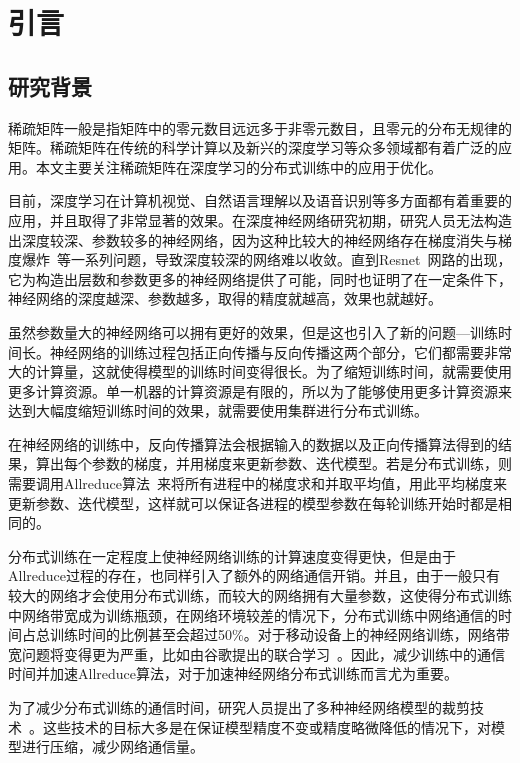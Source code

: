 \chapter{引言}
\label{chap1}

\section{研究背景}
稀疏矩阵一般是指矩阵中的零元数目远远多于非零元数目，且零元的分布无规律的矩阵。稀疏矩阵在传统的科学计算以及新兴的深度学习等众多领域都有着广泛的应用。本文主要关注稀疏矩阵在深度学习的分布式训练中的应用于优化。

目前，深度学习在计算机视觉、自然语言理解以及语音识别等多方面都有着重要的应用，并且取得了非常显著的效果。在深度神经网络研究初期，研究人员无法构造出深度较深、参数较多的神经网络，因为这种比较大的神经网络存在梯度消失与梯度爆炸~\cite{bengio1994learning, glorot2010understanding}等一系列问题，导致深度较深的网络难以收敛。直到Resnet~\cite{he2016deep}网路的出现，它为构造出层数和参数更多的神经网络提供了可能，同时也证明了在一定条件下，神经网络的深度越深、参数越多，取得的精度就越高，效果也就越好。

虽然参数量大的神经网络可以拥有更好的效果，但是这也引入了新的问题---训练时间长。神经网络的训练过程包括正向传播与反向传播这两个部分，它们都需要非常大的计算量，这就使得模型的训练时间变得很长。为了缩短训练时间，就需要使用更多计算资源。单一机器的计算资源是有限的，所以为了能够使用更多计算资源来达到大幅度缩短训练时间的效果，就需要使用集群进行分布式训练。

在神经网络的训练中，反向传播算法会根据输入的数据以及正向传播算法得到的结果，算出每个参数的梯度，并用梯度来更新参数、迭代模型。若是分布式训练，则需要调用Allreduce算法~\cite{rabenseifner2004optimization,bruck1997efficient}来将所有进程中的梯度求和并取平均值，用此平均梯度来更新参数、迭代模型，这样就可以保证各进程的模型参数在每轮训练开始时都是相同的。

分布式训练在一定程度上使神经网络训练的计算速度变得更快，但是由于Allreduce过程的存在，也同样引入了额外的网络通信开销。并且，由于一般只有较大的网络才会使用分布式训练，而较大的网络拥有大量参数，这使得分布式训练中网络带宽成为训练瓶颈，在网络环境较差的情况下，分布式训练中网络通信的时间占总训练时间的比例甚至会超过50\%。对于移动设备上的神经网络训练，网络带宽问题将变得更为严重，比如由谷歌提出的联合学习~\cite{federatedLearning}。因此，减少训练中的通信时间并加速Allreduce算法，对于加速神经网络分布式训练而言尤为重要。

为了减少分布式训练的通信时间，研究人员提出了多种神经网络模型的裁剪技术~\cite{strom2015scalable, han2015deep, lin2017deep}。这些技术的目标大多是在保证模型精度不变或精度略微降低的情况下，对模型进行压缩，减少网络通信量。

